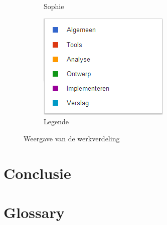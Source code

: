 \documentclass[i1]{oss}
\begin{document}
\begin{figure}[h!]
\begin{subfigure}[hb]{0.20\textwidth}
                \caption{Sophie}
        \end{subfigure}%
                \begin{subfigure}[hb]{0.20\textwidth}
                \centering
                \includegraphics[width=\textwidth]{legende}
                \caption{Legende}
        \end{subfigure}%


 \caption{Weergave van de werkverdeling}
\label{fig:werkverdeling}
\end{figure}





\section{Conclusie}
\label{ssec:Conclusie}



\section{Glossary}
\label{ssec:glossary}
\end{document}
